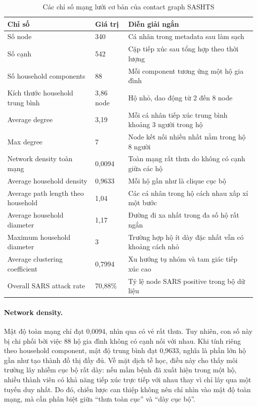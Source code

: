 \documentclass[12pt,a4paper]{report}
\theoremstyle{definition}
\begin{document}
\begin{table}[H]
\centering
\caption{Các chỉ số mạng lưới cơ bản của contact graph SASHTS}
\label{tab:basic_network_metrics_ch3}
\small
\begin{tabular}{L{5.8cm} C{2.8cm} L{5.2cm}}
\toprule
\textbf{Chỉ số} & \textbf{Giá trị} & \textbf{Diễn giải ngắn}\\
\midrule
Số node & 340 & Cá nhân trong metadata sau làm sạch\\
Số cạnh & 542 & Cặp tiếp xúc sau tổng hợp theo thời lượng\\
Số household components & 88 & Mỗi component tương ứng một hộ gia đình\\
Kích thước household trung bình & 3,86 node & Hộ nhỏ, dao động từ 2 đến 8 node\\
Average degree & 3,19 & Mỗi cá nhân tiếp xúc trung bình khoảng 3 người trong hộ\\
Max degree & 7 & Node kết nối nhiều nhất nằm trong hộ 8 người\\
Network density toàn mạng & 0,0094 & Toàn mạng rất thưa do không có cạnh giữa các hộ\\
Average household density & 0,9633 & Mỗi hộ gần như là clique cục bộ\\
Average path length theo household & 1,04 & Các cá nhân trong hộ cách nhau xấp xỉ một bước\\
Average household diameter & 1,17 & Đường đi xa nhất trong đa số hộ rất ngắn\\
Maximum household diameter & 3 & Trường hợp hộ ít dày đặc nhất vẫn có khoảng cách nhỏ\\
Average clustering coefficient & 0,7994 & Xu hướng tụ nhóm và tam giác tiếp xúc cao\\
Overall SARS attack rate & 70,88\% & Tỷ lệ node SARS positive trong bộ dữ liệu\\
\bottomrule
\end{tabular}
\end{table}

\paragraph{Network density.}
Mật độ toàn mạng chỉ đạt 0,0094, nhìn qua có vẻ rất thưa. Tuy nhiên, con số này bị chi phối bởi việc 88 hộ gia đình không có cạnh nối với nhau. Khi tính riêng theo household component, mật độ trung bình đạt 0,9633, nghĩa là phần lớn hộ gần như tạo thành đồ thị đầy đủ. Về mặt dịch tễ học, điều này cho thấy môi trường lây nhiễm cục bộ rất dày: nếu mầm bệnh đã xuất hiện trong một hộ, nhiều thành viên có khả năng tiếp xúc trực tiếp với nhau thay vì chỉ lây qua một tuyến duy nhất. Do đó, chiến lược can thiệp không nên chỉ nhìn vào mật độ toàn mạng, mà cần phân biệt giữa ``thưa toàn cục'' và ``dày cục bộ''.
\end{document}
